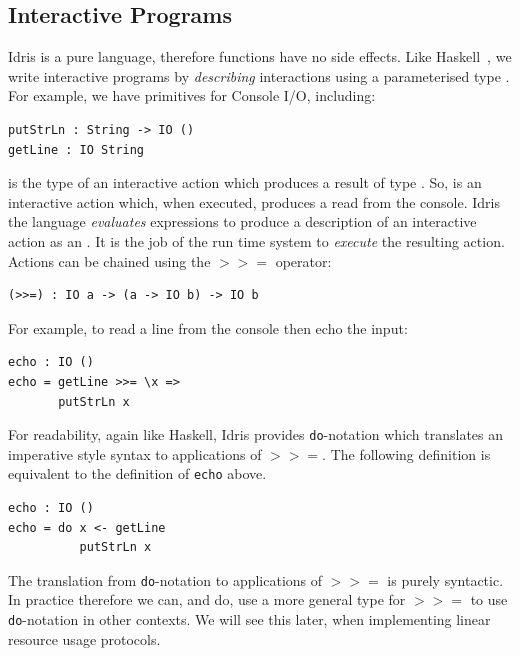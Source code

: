\subsection{Interactive Programs}

\label{sec:interactive}

Idris is a pure language, therefore functions have no side effects. Like
Haskell~\cite{awkward}, we write interactive programs by \emph{describing} interactions using
a parameterised type . For example, we have primitives for Console I/O, including:

\begin{lstlisting}
putStrLn : String -> IO ()
getLine : IO String
\end{lstlisting}

 is the type of an interactive action which produces a result of
type . So,  is an interactive action which, when executed,
produces a  read from the console. Idris the language \emph{evaluates}
expressions to produce a description of an interactive action as an .
It is the job of the run time system to \emph{execute} the resulting action.
Actions can be chained using the $\mathtt{>>=}$ operator:

\begin{lstlisting}
(>>=) : IO a -> (a -> IO b) -> IO b
\end{lstlisting}

For example, to read a line from the console then echo the input:

\begin{lstlisting}
echo : IO ()
echo = getLine >>= \x => 
       putStrLn x
\end{lstlisting}

For readability, again like Haskell, Idris provides \texttt{do}-notation which
translates an imperative style syntax to applications of $\mathtt{>>=}$. The
following definition is equivalent to the definition of \texttt{echo}
above.

\begin{lstlisting}
echo : IO ()
echo = do x <- getLine
          putStrLn x
\end{lstlisting}

The translation from \texttt{do}-notation to applications of $\mathtt{>>=}$
is purely syntactic. In practice therefore we can, and do, use a more general
type for $\mathtt{>>=}$ to use \texttt{do}-notation in other contexts. We will
see this later, when implementing linear resource usage protocols.


